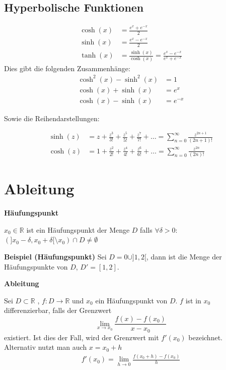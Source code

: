 \documentclass[25pt]{sciposter}
\newcommand{\R}{\mathbb{R}}
\newenvironment{method}[1]{\begin{mdframed}[backgroundcolor=blue!10,innertopmargin=15pt, innerbottommargin=15pt, nobreak=true]
		\textbf{#1 }
	}
	{ 
	\end{mdframed}
}
\begin{document}
\begin{multicols}{3}
\subsection*{Hyperbolische Funktionen}
\begin{align*}
\cosh(x) &= \frac{e^x + e^{-x}}{2}\\
\sinh(x) &= \frac{e^x - e^{-x}}{2}\\
\tanh(x) &= \frac{\sinh(x)}{\cosh(x)} = \frac{e^x - e^{-x}}{e^x + e^{-x}}
\end{align*}
Dies gibt die folgenden Zusammenhänge:
\begin{align*}
\cosh^2(x) - \sinh^2(x) &= 1\\
\cosh(x) + \sinh(x) &= e^x\\
\cosh(x) - \sinh(x) &= e^{-x}
\end{align*}

Sowie die Reihendarstellungen:

\begin{align*}
\sinh(z)&=z+{\frac {z^{3}}{3!}}+{\frac {z^{5}}{5!}}+{\frac {z^{7}}{7!}}+\dots =\sum _{n=0}^{\infty }{\frac {z^{2n+1}}{(2n+1)!}}\\
\cosh(z)&=1+{\frac {z^{2}}{2!}}+{\frac {z^{4}}{4!}}+{\frac {z^{6}}{6!}}+\dots =\sum _{n=0}^{\infty }{\frac {z^{2n}}{(2n)!}}
\end{align*}










\section{Ableitung}

\begin{method}{Häufungspunkt} 
	$x_0 \in \R$ ist ein Häufungspunkt der Menge $D$ falls $\forall \delta > 0$:
	$(]x_0 - \delta, x_0 + \delta [ \setminus x_0) \cap D \not = \emptyset$
\end{method}
\textbf{Beispiel (Häufungspunkt)} Sei $D = {0} \cup ] 1,2 [$, dann ist die Menge der Häufungspunkte von $D$, $D' = [1,2]$.


\begin{method}{Ableitung}
	Sei $D \subset \R$ , $f:D \to  \R$ und $x_0$ ein Häufungspunkt von $D$. $f$ ist in $x_0$ differenzierbar, falls der Grenzwert 
	$$ \lim\limits_{x \to x_0} \frac{f(x) -f(x_0)}{x-x_0}$$
	existiert. Ist dies der Fall, wird der Grenzwert mit $f'(x_0)$ bezeichnet.\\
	Alternativ nutzt man auch $x = x_0 + h$
	\begin{align*}
			f'(x_0) = \lim\limits_{h \to 0} \frac{f(x_0 + h) - f(x_0)}{h}
	\end{align*}
\end{method}



\end{multicols}
\end{document}
